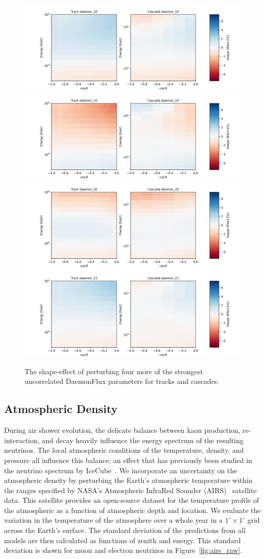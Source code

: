 \documentclass[main.tex]{subfiles}
\begin{document}
\begin{figure}
    \centering
    \includegraphics[width=0.45\linewidth]{figures/systematics/daemon_18.png}%
    \includegraphics[width=0.45\linewidth]{figures/systematics/daemon_19.png}\\
    \includegraphics[width=0.45\linewidth]{figures/systematics/daemon_20.png}%
    \includegraphics[width=0.45\linewidth]{figures/systematics/daemon_23.png}
    \caption{The shape-effect of perturbing four more of the strongest uncorrelated DaemonFlux parameters for tracks and cascades.}\label{fig:daemon_analysis_two}
\end{figure}

\subsection{Atmospheric Density}\label{sec:atm_dense}

During air shower evolution, the delicate balance between kaon production, re-interaction, and decay heavily influence the energy spectrum of the resulting neutrinos. 
The local atmospheric conditions of the temperature, density, and pressure all influence this balance; an effect that has previously been studied in the neutrino spectrum by IceCube~\cite{heix2019seasonal,abbasi2023observation}. 
We incorporate an uncertainty on the atmospheric density by perturbing the Earth's atmospheric temperature within the ranges specified by NASA's Atmospheric InfraRed Sounder (AIRS)~\cite{airs_ref} satellite data. 
This satellite provides an open-source dataset for the temperature profile of the atmospheric as a function of atmospheric depth and location. 
We evaluate the variation in the temperature of the atmosphere over a whole year in a $1^{\circ}\times1^{\circ}$ grid across the Earth's surface. 
The standard deviation of the predictions from all models are then calculated as functions of zenith and energy. 
This standard deviation is shown for muon and electron neutrinos in Figure~\ref{fig:airs_raw}.
\end{document}
